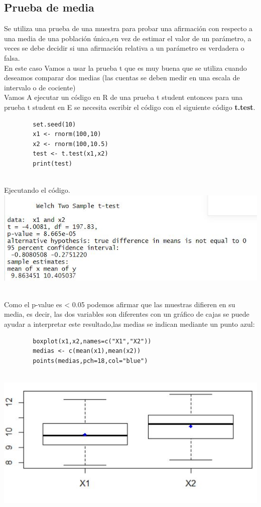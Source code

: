 \documentclass[12pt,hidelinks]{article}
\begin{document}
    \subsection{Prueba de media}
    Se utiliza una prueba de una muestra para probar una afirmación con respecto a una media de una población única,en vez de estimar el valor de un parámetro, a veces se debe decidir si una afirmación relativa a un parámetro es verdadera o falsa.
    \\ En este caso Vamos a usar la prueba t que es muy buena que se utiliza cuando deseamos comparar dos medias (las cuentas se deben medir en una escala de intervalo o de cociente)\\
    Vamos A ejecutar un código en R de una prueba t student entonces para una prueba t student en E se necesita escribir el código con el siguiente código \textbf{t.test}.
        \begin{lstlisting}
        set.seed(10)
        x1 <- rnorm(100,10) 
        x2 <- rnorm(100,10.5) 
        test <- t.test(x1,x2)
        print(test)
        \end{lstlisting}\\
        Ejecutando el código.
            \centering
            \includegraphics[scale=0.8]{t-s.JPG}\\
            \centering
            \caption{}\\
    Como el p-value es < 0.05 podemos afirmar que las muestras difieren en su media, es decir, las dos variables son diferentes con un gráfico de cajas se puede ayudar a interpretar este resultado,las medias se indican mediante un punto azul:\\   
    \begin{lstlisting}
        boxplot(x1,x2,names=c("X1","X2"))
        medias <- c(mean(x1),mean(x2))
        points(medias,pch=18,col="blue")
        \end{lstlisting}\\
            \centering
            \includegraphics[scale=0.8]{grafica-t.JPG}\\
            \centering
            \caption{}\\



\end{document}

